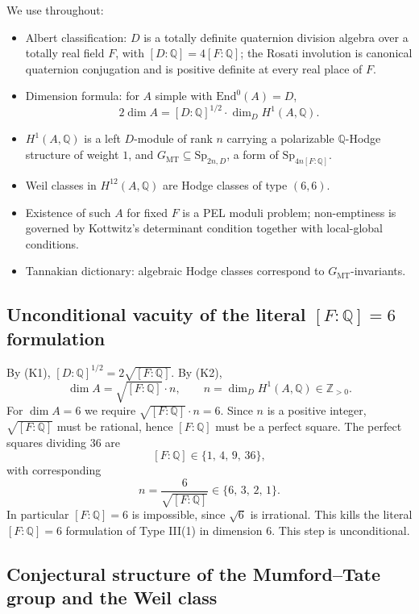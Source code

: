\documentclass{article}
\begin{document}
We use throughout:
\begin{itemize}
  \item[(K1)] Albert classification: $D$ is a totally definite quaternion division algebra over a totally real field $F$, with $[D:\mathbb{Q}] = 4[F:\mathbb{Q}]$; the Rosati involution is canonical quaternion conjugation and is positive definite at every real place of $F$.
  \item[(K2)] Dimension formula: for $A$ simple with $\mathrm{End}^0(A) = D$,
  \[
  2 \dim A = [D:\mathbb{Q}]^{1/2} \cdot \dim_D H^1(A,\mathbb{Q}).
  \]
  \item[(K4)] $H^1(A,\mathbb{Q})$ is a left $D$-module of rank $n$ carrying a polarizable $\mathbb{Q}$-Hodge structure of weight $1$, and $G_{\mathrm{MT}} \subseteq \mathrm{Sp}_{2n,D}$, a form of $\mathrm{Sp}_{4n[F:\mathbb{Q}]}$.
  \item[(K5)] Weil classes in $H^{12}(A,\mathbb{Q})$ are Hodge classes of type $(6,6)$.
  \item[(K6)] Existence of such $A$ for fixed $F$ is a PEL moduli problem; non-emptiness is governed by Kottwitz's determinant condition together with local-global conditions.
  \item[(K7)] Tannakian dictionary: algebraic Hodge classes correspond to $G_{\mathrm{MT}}$-invariants.
\end{itemize}

\subsection*{Unconditional vacuity of the literal $[F:\mathbb{Q}]=6$ formulation}
\label{sec:vacuity}

By (K1), $[D:\mathbb{Q}]^{1/2} = 2\sqrt{[F:\mathbb{Q}]}$. By (K2),
\[
\dim A = \sqrt{[F:\mathbb{Q}]} \cdot n, \qquad n = \dim_D H^1(A,\mathbb{Q}) \in \mathbb{Z}_{>0}.
\]
For $\dim A = 6$ we require $\sqrt{[F:\mathbb{Q}]}\cdot n = 6$. Since $n$ is a positive integer, $\sqrt{[F:\mathbb{Q}]}$ must be rational, hence $[F:\mathbb{Q}]$ must be a perfect square. The perfect squares dividing $36$ are
\[
[F:\mathbb{Q}] \in \{1,\,4,\,9,\,36\},
\]
with corresponding
\[
n = \frac{6}{\sqrt{[F:\mathbb{Q}]}} \in \{6,\,3,\,2,\,1\}.
\]
In particular $[F:\mathbb{Q}] = 6$ is impossible, since $\sqrt{6}$ is irrational. This kills the literal $[F:\mathbb{Q}]=6$ formulation of Type III(1) in dimension $6$. This step is unconditional.

\subsection*{Conjectural structure of the Mumford--Tate group and the Weil class}
\end{document}
